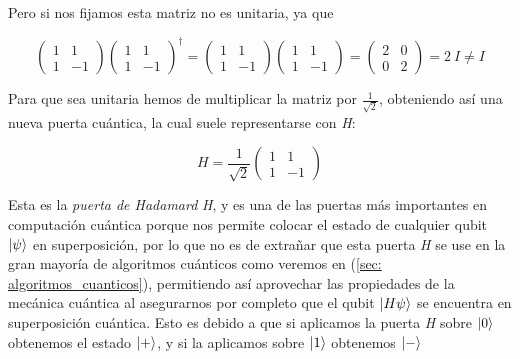 \documentclass{article}
\numberwithin{equation}{section} %
\begin{document}
    Pero si nos fijamos esta matriz no es unitaria, ya que

    \begin{equation*}
        \begin{pmatrix}
            1 & 1 \\
            1 & -1
        \end{pmatrix} \begin{pmatrix}
            1 & 1 \\
            1 & -1
        \end{pmatrix} ^ {\dagger} = \begin{pmatrix}
            1 & 1 \\
            1 & -1
        \end{pmatrix} \begin{pmatrix}
            1 & 1 \\
            1 & -1
        \end{pmatrix} = \begin{pmatrix}
            2 & 0 \\
            0 & 2
        \end{pmatrix} = 2 \ I \neq I
    \end{equation*}

    \vspace{2.5mm} 

    Para que sea unitaria hemos de multiplicar la matriz por \( \frac{1}{\sqrt{2}} \), obteniendo así una nueva puerta cuántica, la cual suele representarse con \textit{H}:

    \begin{equation}
        H = \frac{1}{\sqrt{2}} \begin{pmatrix}
            1 & 1 \\
            1 & -1
        \end{pmatrix}
        \label{eq: puerta_hadamard}
    \end{equation}

    \vspace{2.5mm}

    Esta es la \textit{puerta de Hadamard} \textit{H}, y es una de las puertas más importantes en computación cuántica porque nos permite colocar el estado de cualquier qubit \( \ket{\psi} \) en superposición, por lo que no es de extrañar que esta puerta \textit{H} se use en la gran mayoría de algoritmos cuánticos como veremos en (\ref{sec: algoritmos_cuanticos}), permitiendo así aprovechar las propiedades de la mecánica cuántica al asegurarnos por completo que el qubit \( \ket{H \psi} \) se encuentra en superposición cuántica. Esto es debido a que si aplicamos la puerta \textit{H} sobre \( \ket{0} \) obtenemos el estado \( \ket{+} \), y si la aplicamos sobre \( \ket{1} \) obtenemos \( \ket{-} \)
\end{document}
